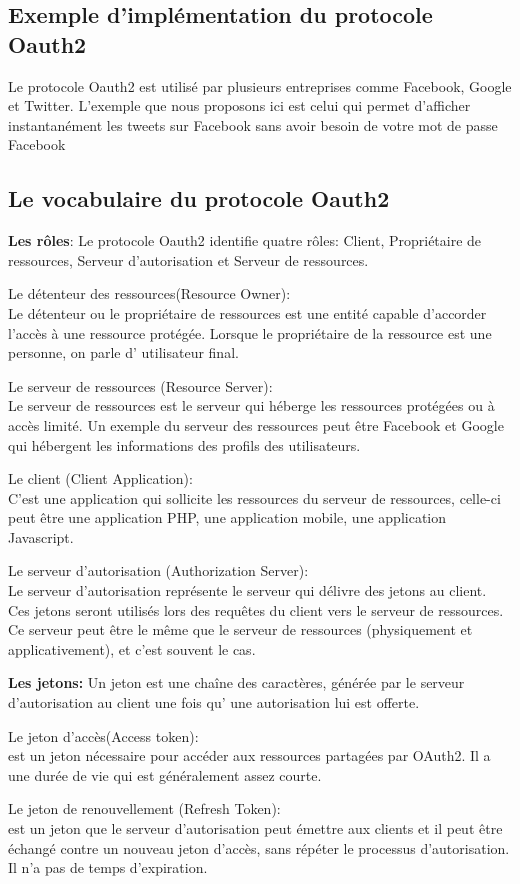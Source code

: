 \subsection{Exemple d’implémentation du protocole Oauth2}

Le protocole Oauth2 est utilisé par plusieurs entreprises comme Facebook, Google et Twitter. L’exemple que nous proposons ici est celui qui permet
d’afficher instantanément les tweets sur Facebook sans avoir besoin de votre mot de passe Facebook
\newpage
\subsection{Le vocabulaire du protocole Oauth2}
\textbf{Les rôles}: Le protocole Oauth2 identifie quatre rôles: Client, Propriétaire de ressources, Serveur d’autorisation
et Serveur de ressources.
\begin{list}{•}
	\item  Le détenteur des ressources(Resource Owner):\\
	 Le détenteur ou le propriétaire de ressources est
	une entité capable d’accorder l’accès à une ressource protégée. Lorsque le propriétaire de la ressource est une personne, on parle d’ utilisateur final.

	\item Le serveur de ressources (Resource Server):\\
	Le serveur de ressources est le serveur qui héberge
	les ressources protégées ou à accès limité. Un exemple du serveur des ressources peut être Facebook et Google qui hébergent les informations des profils des utilisateurs.
	\item Le client (Client Application): \\
	C’est une application qui sollicite les ressources du serveur de
	ressources, celle-ci peut être une application PHP, une application mobile, une application Javascript.
	\item Le serveur d’autorisation (Authorization Server):\\
	Le serveur d’autorisation représente le serveur
	qui délivre des jetons au client. Ces jetons seront utilisés lors des requêtes du client vers le serveur de ressources. Ce serveur peut être le même que le serveur de ressources (physiquement et applicativement), et c’est souvent le cas.
\end{list}
\textbf{Les jetons:} Un jeton est une chaîne des caractères, générée par le serveur d’autorisation au client une fois
qu’ une autorisation lui est offerte.
\begin{list}{•}
	\item Le jeton d’accès(Access token):\\
	 est un jeton nécessaire pour accéder aux ressources partagées par
	OAuth2. Il a une durée de vie qui est généralement assez courte.
	\item  
	\item Le jeton de renouvellement (Refresh Token):\\
	 est un jeton que le serveur d’autorisation peut émettre aux clients et il peut être échangé contre un nouveau jeton d’accès, sans répéter le processus d’autorisation. Il n’a pas de temps d’expiration.
\end{list}

